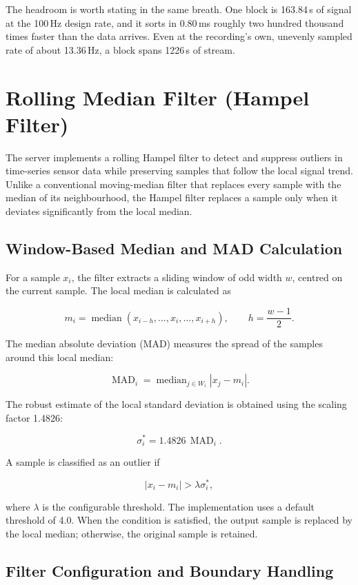 \documentclass[12pt,a4paper,oneside]{report}
\begin{document}
The headroom is worth stating in the same breath. One block is 163.84\,s of signal
at the 100\,Hz design rate, and it sorts in 0.80\,ms  roughly two hundred
thousand times faster than the data arrives. Even at the recording's own,
unevenly sampled rate of about 13.36\,Hz, a block spans 1226\,s of stream.

\section{Rolling Median Filter (Hampel Filter)}

The server implements a rolling Hampel filter to detect and suppress outliers in time-series sensor data while preserving samples that follow the local signal trend. Unlike a conventional moving-median filter that replaces every sample with the median of its neighbourhood, the Hampel filter replaces a sample only when it deviates significantly from the local median.

\subsection{Window-Based Median and MAD Calculation}

For a sample \(x_i\), the filter extracts a sliding window of odd width \(w\), centred on the current sample. The local median is calculated as

\[
m_i = \operatorname{median}
\left(
x_{i-h},\ldots,x_i,\ldots,x_{i+h}
\right),
\qquad h=\frac{w-1}{2}.
\]

The median absolute deviation (MAD) measures the spread of the samples around this local median:

\[
\operatorname{MAD}_i =
\operatorname{median}_{j\in W_i}
\left|x_j-m_i\right|.
\]

The robust estimate of the local standard deviation is obtained using the scaling factor 1.4826:

\[
\sigma_i^{*}=1.4826\,\operatorname{MAD}_i.
\]

A sample is classified as an outlier if

\[
|x_i-m_i| > \lambda \sigma_i^{*},
\]

where \(\lambda\) is the configurable threshold. The implementation uses a default threshold of 4.0. When the condition is satisfied, the output sample is replaced by the local median; otherwise, the original sample is retained.

\subsection{Filter Configuration and Boundary Handling}
\end{document}

